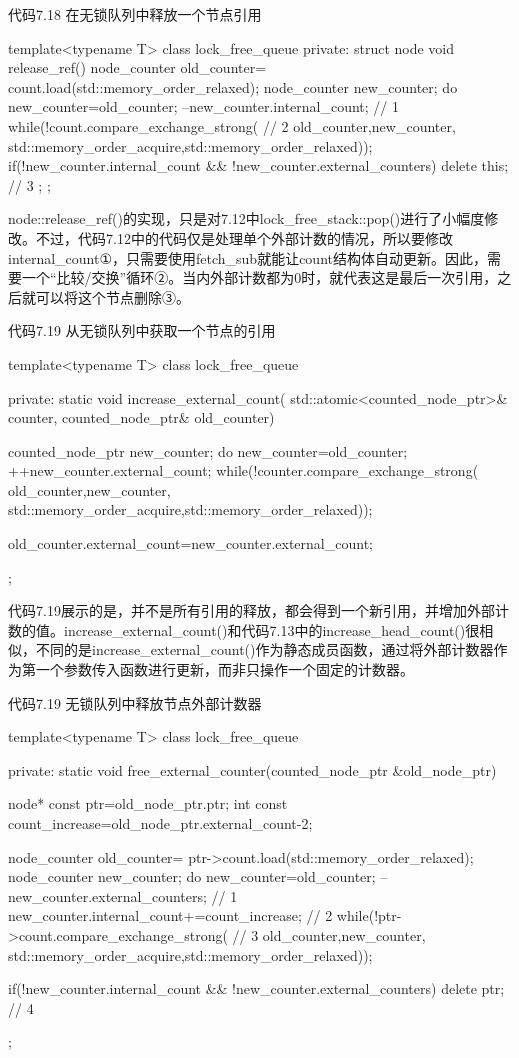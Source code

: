 代码7.18 在无锁队列中释放一个节点引用

\begin{cpp}
template<typename T>
class lock_free_queue
{
private:
  struct node
  {
    void release_ref()
    {
      node_counter old_counter=
        count.load(std::memory_order_relaxed);
      node_counter new_counter;
      do
      {
        new_counter=old_counter;
        --new_counter.internal_count;  // 1
      }
      while(!count.compare_exchange_strong(  // 2
            old_counter,new_counter,
            std::memory_order_acquire,std::memory_order_relaxed));
      if(!new_counter.internal_count &&
         !new_counter.external_counters)
      {
        delete this;  // 3
      }
    }
  };
};
\end{cpp}

node::release\_ref()的实现，只是对7.12中lock\_free\_stack::pop()进行了小幅度修改。不过，代码7.12中的代码仅是处理单个外部计数的情况，所以要修改internal\_count①，只需要使用fetch\_sub就能让count结构体自动更新。因此，需要一个“比较/交换”循环②。当内外部计数都为0时，就代表这是最后一次引用，之后就可以将这个节点删除③。

代码7.19 从无锁队列中获取一个节点的引用

\begin{cpp}
template<typename T>
class lock_free_queue
{
private:
  static void increase_external_count(
    std::atomic<counted_node_ptr>& counter,
    counted_node_ptr& old_counter)
  {
    counted_node_ptr new_counter;
    do
    {
      new_counter=old_counter;
      ++new_counter.external_count;
    }
    while(!counter.compare_exchange_strong(
      old_counter,new_counter,
      std::memory_order_acquire,std::memory_order_relaxed));

    old_counter.external_count=new_counter.external_count;
  }
};
\end{cpp}

代码7.19展示的是，并不是所有引用的释放，都会得到一个新引用，并增加外部计数的值。increase\_external\_count()和代码7.13中的increase\_head\_count()很相似，不同的是increase\_external\_count()作为静态成员函数，通过将外部计数器作为第一个参数传入函数进行更新，而非只操作一个固定的计数器。

代码7.19 无锁队列中释放节点外部计数器

\begin{cpp}
template<typename T>
class lock_free_queue
{
private:
  static void free_external_counter(counted_node_ptr &old_node_ptr)
  {
    node* const ptr=old_node_ptr.ptr;
    int const count_increase=old_node_ptr.external_count-2;

    node_counter old_counter=
      ptr->count.load(std::memory_order_relaxed);
    node_counter new_counter;
    do
    {
      new_counter=old_counter;
      --new_counter.external_counters;  // 1
      new_counter.internal_count+=count_increase;  // 2
    }
    while(!ptr->count.compare_exchange_strong(  // 3
           old_counter,new_counter,
           std::memory_order_acquire,std::memory_order_relaxed));

    if(!new_counter.internal_count &&
       !new_counter.external_counters)
    {
      delete ptr;  // 4
    }
  }
};
\end{cpp}

